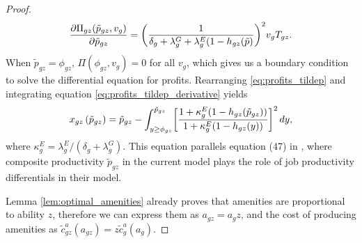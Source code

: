 \begin{proof}
    \begin{align}
        \frac{\partial \Pi_{gz}(\tilde{p}_{gz},v_{g})}{\partial \tilde{p}_{gz}} = \biggl{(} \frac{1}{\delta_{g} + \lambda_{g}^{G} + \lambda_{g}^{E} (1 - h_{gz}(\tilde{p})} \biggr{)}^2 v_{g} T_{gz}. \label{eq:profits_tildep_derivative}
    \end{align}
    When $\tilde{p}_{gz} = \phi_{gz}$, $\Pi(\phi_{gz}, v_{g}) = 0$ for all $v_{g}$, which gives us a boundary condition to solve the differential equation for profits. Rearranging \eqref{eq:profits_tildep} and integrating equation \eqref{eq:profits_tildep_derivative} yields
    \begin{align}
        x_{gz}\left(\tilde{p}_{gz}\right) = \tilde{p}_{gz} %
        - \int_{y \ge \phi_{gz}}^{\tilde{p}_{gz}} \biggl{[} \frac{1 + \kappa_{g}^{E} (1 - h_{gz} (\tilde{p}_{gz}))}{1 + \kappa_{g}^{E} (1 - h_{gz} (y))} \biggr{]}^2 \diff y, \label{eq:BMutility}
    \end{align}
    where $\kappa_{g}^{E} = \lambda_{g}^{E}/(\delta_{g} + \lambda_{g}^{G})$. This equation parallels equation (47) in \cite{BurdettMortensen1998}, where composite productivity $\tilde{p}_{gz}$ in the current model plays the role of job productivity differentials in their model.

    Lemma \ref{lem:optimal_amenities} already proves that amenities are proportional to ability $z$, therefore we can express them as $a_{gz} = a_{g} z$, and the cost of producing amenities as $\tilde{c}_{gz}^{a}(a_{gz}) = z \tilde{c}_{g}^{a}(a_{g})$.


\end{proof}
